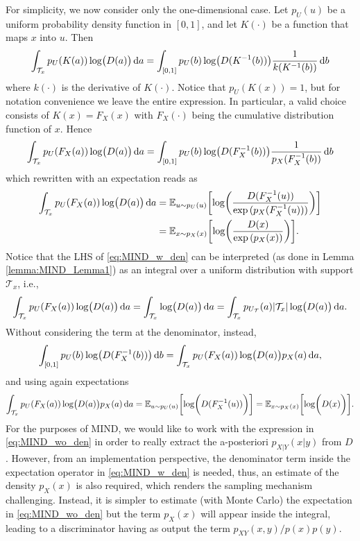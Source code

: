 For simplicity, we now consider only the one-dimensional case. Let $p_U(u)$ be a uniform probability density function in $[0,1]$, and let $K(\cdot)$ be a function that maps $x$ into $u$. Then
\begin{equation}
   \int_{\mathcal{T}_x}{p_U(K(a))  \log \bigl(D(a)\bigr)} \mathop{}\!\mathrm{d} a = \int_{[0,1]}{p_U(b)  \log \bigl(D(K^{-1}(b))\bigr)} \frac{1}{k(K^{-1}(b))} \mathop{}\!\mathrm{d} b
\end{equation}
where $k(\cdot)$ is the derivative of $K(\cdot)$. Notice that $p_U(K(x))=1$, but for notation convenience we leave the entire expression. In particular, a valid choice consists of $K(x)=F_X(x)$ with $F_X(\cdot)$ being the cumulative distribution function of $x$. Hence
\begin{equation}
   \int_{\mathcal{T}_x}{p_U(F_X(a))  \log \bigl(D(a)\bigr)} \mathop{}\!\mathrm{d} a = \int_{[0,1]}{p_U(b)  \log \bigl(D(F_{X}^{-1}(b))\bigr)} \frac{1}{p_X(F_{X}^{-1}(b))} \mathop{}\!\mathrm{d} b
\end{equation}
which rewritten with an expectation reads as
\begin{align}
\label{eq:MIND_w_den}
   \int_{\mathcal{T}_x}{p_U(F_X(a))  \log \bigl(D(a)\bigr)} \mathop{}\!\mathrm{d} a = & \; \mathbb{E}_{u \sim p_{U}(u)}\biggl[\log \biggl( \frac{D(F_{X}^{-1}(u))}{\exp{(p_X(F_{X}^{-1}(u))})} \biggr)\biggr] \nonumber \\
   = & \; \mathbb{E}_{x \sim p_{X}(x)}\biggl[\log \biggl( \frac{D(x)}{\exp{(p_X(x)})} \biggr)\biggr].
\end{align}
Notice that the LHS of \eqref{eq:MIND_w_den} can be interpreted (as done in Lemma \ref{lemma:MIND_Lemma1}) as an integral over a uniform distribution with support $\mathcal{T}_x$, i.e.,
\begin{equation}
    \int_{\mathcal{T}_x}{p_U(F_X(a))  \log \bigl(D(a)\bigr)} \mathop{}\!\mathrm{d} a = \int_{\mathcal{T}_x}{\log \bigl(D(a)\bigr)} \mathop{}\!\mathrm{d} a = \int_{\mathcal{T}_x}{p_{U_{\mathcal{T}}}(a)  |\mathcal{T}_x|\log \bigl(D(a)\bigr)} \mathop{}\!\mathrm{d} a. 
\end{equation}
Without considering the term at the denominator, instead,
\begin{equation}
   \int_{[0,1]}{p_U(b)  \log \bigl(D(F_{X}^{-1}(b))\bigr)} \mathop{}\!\mathrm{d} b = \int_{\mathcal{T}_x}{p_U(F_X(a))  \log \bigl(D(a)\bigr)p_X(a)} \mathop{}\!\mathrm{d} a,
\end{equation}
and using again expectations
\begin{equation}
\small
\label{eq:MIND_wo_den}
   \int_{\mathcal{T}_x}{p_U(F_X(a))  \log \bigl(D(a)\bigr)p_X(a)} \mathop{}\!\mathrm{d} a = \mathbb{E}_{u \sim p_{U}(u)}\biggl[\log \biggl( D(F_{X}^{-1}(u)) \biggr)\biggr] = \mathbb{E}_{x \sim p_{X}(x)}\biggl[\log \biggl( D(x) \biggr)\biggr] .
\end{equation}
For the purposes of MIND, we would like to work with the expression in \eqref{eq:MIND_wo_den} in order to really extract the a-posteriori $p_{X|Y}(x|y)$ from $D$. However, from an implementation perspective, the denominator term inside the expectation operator in \eqref{eq:MIND_w_den} is needed, thus, an estimate of the density $p_X(x)$ is also required, which renders the sampling mechanism challenging. Instead, it is simpler to estimate (with Monte Carlo) the expectation in \eqref{eq:MIND_wo_den} but the term $p_X(x)$ will appear inside the integral, leading to a discriminator having as output the term $p_{XY}(x,y)/p(x)p(y)$.